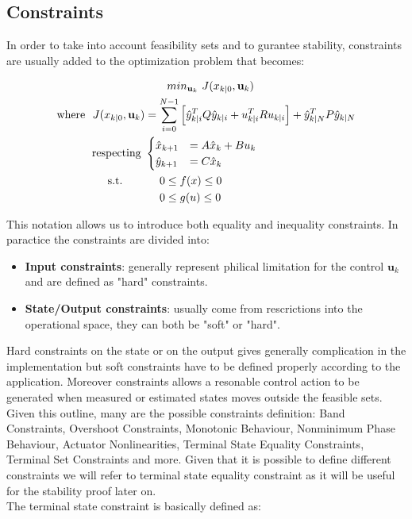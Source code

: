 \subsection{Constraints}

In order to take into account feasibility sets and to gurantee stability, constraints are usually added to the optimization problem that becomes: 

\begin{equation} \label{MPC_problem_constrained}
\begin{split}
		&\qquad min_{\textbf{u}_k}\ J(x_{k|0},\textbf{u}_k) \\
		\textnormal{where}\ \  
		 J(x_{k|0},\textbf{u}_k) &= \sum_{i=0}^{N-1} \left[\hat{y}_{k|i}^T Q \hat{y}_{k|i} + u_{k|i}^TRu_{k|i} \right] + \hat{y}_{k|N}^T P \hat{y}_{k|N} \\
		\textnormal{respecting}\ &  	
		\begin{cases}
			\hat{x}_{k+1}&=A\hat{x}_k+Bu_k \\
			\hat{y}_{k+1}&=C\hat{x}_k
		\end{cases} \\
		\textnormal{s.t.}\qquad
		&\ \ \ \ 0 \leq f(x)\leq 0 \\
		&\ \ \ \ 0 \leq g(u)\leq 0 \\
	\end{split}	
\end{equation}

This notation allows us to introduce both equality and inequality constraints. In paractice the constraints are divided into: 
\begin{itemize}
 \item \textbf{Input constraints}: generally represent philical limitation for the control $\textbf{u}_k$ and are defined as "hard" constraints.
 	\item \textbf{State/Output constraints}: usually come from rescrictions into the operational space, they can both be "soft" or "hard".
\end{itemize} 

Hard constraints on the state or on the output gives generally complication in the implementation but soft constraints have to be defined properly according to the application. Moreover constraints allows a resonable control action to be generated when measured or estimated states moves outside the feasible sets. Given this outline, many are the possible constraints definition: Band Constraints, Overshoot Constraints, Monotonic Behaviour, Nonminimum Phase Behaviour, Actuator Nonlinearities, Terminal State Equality Constraints, Terminal Set Constraints and more. Given that it is possible to define different constraints we will refer to terminal state equality constraint as it will be useful for the stability proof later on. \\
The terminal state constraint is basically defined as: 

